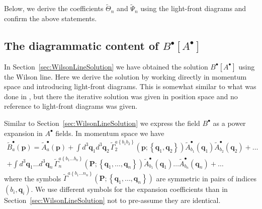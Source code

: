 \documentclass[english,american]{article}
\begin{document}
Below, we derive the coefficients $\tilde{\Theta}_{n}$ and $\tilde{\Psi}_{n}$
using the light-front diagrams and confirm the above statements.

\subsection{The diagrammatic content of $B^{\bullet}\left[A^{\bullet}\right]$}

\label{sub:Diagramm_B+}

In Section~\ref{sec:WilsonLineSolution} we have obtained the solution
$B^{\bullet}\left[A^{\bullet}\right]$ using the Wilson line. Here
we derive the solution by working directly in momentum space and introducing
light-front  diagrams. This is somewhat similar to what was
done in \citep{Mansfield2006}, but there the iterative solution was
given in position space and no reference to light-front  diagrams
was given. 

Similar to Section~\ref{sec:WilsonLineSolution} we express the field
$B^{\bullet}$ as a power expansion in $A^{\bullet}$ fields. In momentum
space we have
\begin{multline}
\tilde{B}_{a}^{\bullet}\left(\mathbf{p}\right)=\tilde{A}_{a}^{\bullet}\left(\mathbf{p}\right)+\int d^{3}\mathbf{q}_{1}d^{3}\mathbf{q}_{2}\,\tilde{\Gamma}_{2}^{a\left\{ b_{1}b_{2}\right\} }\left(\mathbf{p};\left\{ \mathbf{q}_{1},\mathbf{q}_{2}\right\} \right)\tilde{A}_{b_{1}}^{\bullet}\left(\mathbf{q}_{1}\right)\tilde{A}_{b_{2}}^{\bullet}\left(\mathbf{q}_{2}\right)+\dots\\
+\int d^{3}\mathbf{q}_{1}\dots d^{3}\mathbf{q}_{n}\,\tilde{\Gamma}_{n}^{a\left\{ b_{1}\dots b_{n}\right\} }\left(\mathbf{P};\left\{ \mathbf{q}_{1},\dots,\mathbf{q}_{n}\right\} \right)\tilde{A}_{b_{1}}^{\bullet}\left(\mathbf{q}_{1}\right)\dots\tilde{A}_{b_{n}}^{\bullet}\left(\mathbf{q}_{n}\right)+\dots\label{eq:BplusFT-1}
\end{multline}
where the symbols $\tilde{\Gamma}^{a\left\{ b_{1}\dots n_{n}\right\} }\left(\mathbf{P};\left\{ \mathbf{q}_{1},\dots,\mathbf{q}_{n}\right\} \right)$
are symmetric in pairs of indices $\left(b_{i},\mathbf{q}_{i}\right)$.
We use different symbols for the expansion coefficients than in Section~\ref{sec:WilsonLineSolution}
not to pre-assume they are identical.
\end{document}

